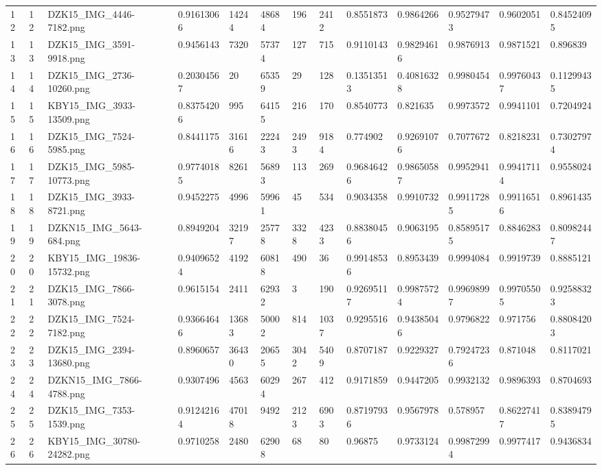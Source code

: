 \documentclass[11pt, a4paper, twoside]{report}
\begin{document}
\begin{longtable}[c]{@{}lllllllllllll@{}}
12 & 12 & DZK15\_IMG\_4446-7182.png & 0.91613066 & 14244 & 48684 & 196 & 2412 & 0.8551873 & 0.9864266 & 0.95279473 & 0.9602051 & 0.84524095 \\
13 & 13 & DZK15\_IMG\_3591-9918.png & 0.9456143 & 7320 & 57374 & 127 & 715 & 0.9110143 & 0.98294616 & 0.9876913 & 0.9871521 & 0.896839 \\
14 & 14 & DZK15\_IMG\_2736-10260.png & 0.20304567 & 20 & 65359 & 29 & 128 & 0.13513513 & 0.40816328 & 0.9980454 & 0.99760437 & 0.11299435 \\
15 & 15 & KBY15\_IMG\_3933-13509.png & 0.83754206 & 995 & 64155 & 216 & 170 & 0.8540773 & 0.821635 & 0.9973572 & 0.9941101 & 0.7204924 \\
16 & 16 & DZK15\_IMG\_7524-5985.png & 0.8441175 & 31616 & 22243 & 2493 & 9184 & 0.774902 & 0.92691076 & 0.7077672 & 0.8218231 & 0.73027974 \\
17 & 17 & DZK15\_IMG\_5985-10773.png & 0.97740185 & 8261 & 56893 & 113 & 269 & 0.96846426 & 0.98650587 & 0.9952941 & 0.99417114 & 0.9558024 \\
18 & 18 & DZK15\_IMG\_3933-8721.png & 0.9452275 & 4996 & 59961 & 45 & 534 & 0.9034358 & 0.9910732 & 0.99117285 & 0.99116516 & 0.8961435 \\
19 & 19 & DZKN15\_IMG\_5643-684.png & 0.8949204 & 32197 & 25778 & 3328 & 4233 & 0.88380456 & 0.9063195 & 0.85895175 & 0.8846283 & 0.80982447 \\
20 & 20 & KBY15\_IMG\_19836-15732.png & 0.94096524 & 4192 & 60818 & 490 & 36 & 0.99148536 & 0.8953439 & 0.9994084 & 0.9919739 & 0.8885121 \\
21 & 21 & DZK15\_IMG\_7866-3078.png & 0.9615154 & 2411 & 62932 & 3 & 190 & 0.92695117 & 0.99875724 & 0.99698997 & 0.99705505 & 0.92588323 \\
22 & 22 & DZK15\_IMG\_7524-7182.png & 0.93664646 & 13683 & 50002 & 814 & 1037 & 0.9295516 & 0.94385046 & 0.9796822 & 0.971756 & 0.88084203 \\
23 & 23 & DZK15\_IMG\_2394-13680.png & 0.8960657 & 36430 & 20655 & 3042 & 5409 & 0.8707187 & 0.9229327 & 0.79247236 & 0.871048 & 0.8117021 \\
24 & 24 & DZKN15\_IMG\_7866-4788.png & 0.9307496 & 4563 & 60294 & 267 & 412 & 0.9171859 & 0.9447205 & 0.9932132 & 0.9896393 & 0.8704693 \\
25 & 25 & DZK15\_IMG\_7353-1539.png & 0.91242164 & 47018 & 9492 & 2123 & 6903 & 0.87197936 & 0.9567978 & 0.578957 & 0.86227417 & 0.83894795 \\
26 & 26 & KBY15\_IMG\_30780-24282.png & 0.9710258 & 2480 & 62908 & 68 & 80 & 0.96875 & 0.9733124 & 0.99872994 & 0.9977417 & 0.9436834 \\

\end{longtable}
\end{document}
